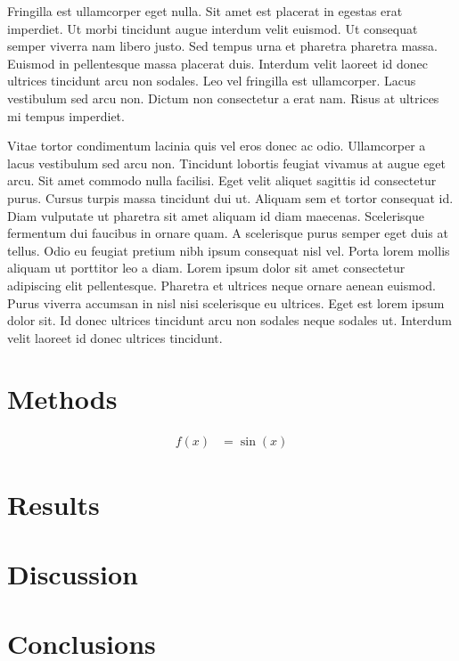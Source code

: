\documentclass[journal=jctcce,manuscript=article,layout=traditional,]{achemso}
\begin{document}
    Fringilla est ullamcorper eget nulla.
    Sit amet est placerat in egestas erat imperdiet.
    Ut morbi tincidunt augue interdum velit euismod.
    Ut consequat semper viverra nam libero justo.
    Sed tempus urna et pharetra pharetra massa.
    Euismod in pellentesque massa placerat duis.
    Interdum velit laoreet id donec ultrices tincidunt arcu non sodales.
    Leo vel fringilla est ullamcorper.
    Lacus vestibulum sed arcu non.
    Dictum non consectetur a erat nam.
    Risus at ultrices mi tempus imperdiet.

    Vitae tortor condimentum lacinia quis vel eros donec ac odio.
    Ullamcorper a lacus vestibulum sed arcu non.
    Tincidunt lobortis feugiat vivamus at augue eget arcu.
    Sit amet commodo nulla facilisi.
    Eget velit aliquet sagittis id consectetur purus.
    Cursus turpis massa tincidunt dui ut.
    Aliquam sem et tortor consequat id.
    Diam vulputate ut pharetra sit amet aliquam id diam maecenas.
    Scelerisque fermentum dui faucibus in ornare quam.
    A scelerisque purus semper eget duis at tellus.
    Odio eu feugiat pretium nibh ipsum consequat nisl vel.
    Porta lorem mollis aliquam ut porttitor leo a diam.
    Lorem ipsum dolor sit amet consectetur adipiscing elit pellentesque.
    Pharetra et ultrices neque ornare aenean euismod.
    Purus viverra accumsan in nisl nisi scelerisque eu ultrices.
    Eget est lorem ipsum dolor sit.
    Id donec ultrices tincidunt arcu non sodales neque sodales ut.
    Interdum velit laoreet id donec ultrices tincidunt.

    \section{Methods}
    \label{sec:methods}

    \begin{align}
        f(x) &= \sin(x)
    \end{align}

    \section{Results}
    \label{sec:results}

    \section{Discussion}
    \label{sec:discussion}

    \section{Conclusions}
    \label{sec:conclusions}
\end{document}

